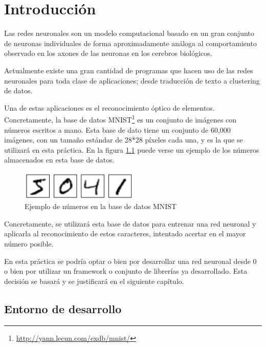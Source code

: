 \chapter{Introducción}

Las redes neuronales son un modelo computacional basado en un gran conjunto de neuronas individuales de forma aproximadamente análoga al comportamiento observado en los axones de las neuronas en los cerebros biológicos.

\bigskip

Actualmente existe una gran cantidad de programas que hacen uso de las redes neuronales para toda clase de aplicaciones; desde traducción de texto a clustering de datos.

\bigskip

Una de estas aplicaciones es el reconocimiento óptico de elementos. Concretamente, la base de datos MNIST\footnote{\url{http://yann.lecun.com/exdb/mnist/}} es un conjunto de imágenes con números escritos a mano. Esta base de dato tiene un conjunto de 60,000 imágenes, con un tamaño estándar de 28*28 píxeles cada una, y es la que se utilizará en esta práctica. En la figura \ref{fig:mnist-numbers} puede verse un ejemplo de los números almacenados en esta base de datos.

\bigskip

\begin{figure}[H]
\centering
\includegraphics[width=0.5\textwidth]{../images/mnist-numbers}
\caption{Ejemplo de números en la base de datos MNIST}
\label{fig:mnist-numbers}
\end{figure}

\bigskip

Concretamente, se utilizará esta base de datos para entrenar una red neuronal y aplicarla al reconocimiento de estos caracteres, intentado acertar en el mayor número posible.

\bigskip

En esta práctica se podría optar o bien por desarrollar una red neuronal desde 0 o bien por utilizar un framework o conjunto de librerías ya desarrollado. Esta decisión se basará y se justificará en el siguiente capítulo.
\bigskip

\section{Entorno de desarrollo}

